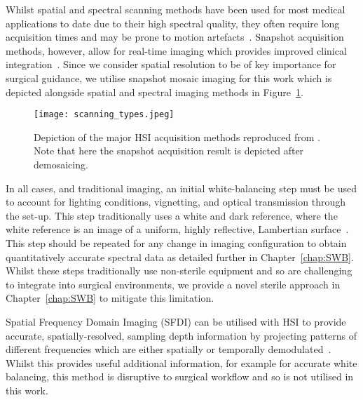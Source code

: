 Whilst spatial and spectral scanning methods have been used for most medical applications to date due to their high spectral quality, they often require long acquisition times and may be prone to motion artefacts~\citep{Kulcke2018, Giannoni2021, Shapey2019, Yoon2021}. Snapshot acquisition methods, however, allow for real-time imaging which provides improved clinical integration~\citep{Ayala2021, Ebner2021}. Since we consider spatial resolution to be of key importance for surgical guidance, we utilise snapshot mosaic imaging for this work which is depicted alongside spatial and spectral imaging methods in Figure~\ref{fig:scanning}.
\begin{figure}[h]
    \centering
    \texttt{[image: scanning\_types.jpeg]}
    \caption{Depiction of the major HSI acquisition methods reproduced from \citep{Araujo-Andrade2021}. Note that here the snapshot acquisition result is depicted after demosaicing.}
    \label{fig:scanning}
\end{figure}

In all cases, and traditional imaging, an initial white-balancing step must be used to account for lighting conditions, vignetting, and optical transmission through the set-up. This step traditionally uses a white and dark reference, where the white reference is an image of a uniform, highly reflective, Lambertian surface~\citep{Lu2014}. This step should be repeated for any change in imaging configuration to obtain quantitatively accurate spectral data as detailed further in Chapter~\ref{chap:SWB}. Whilst these steps traditionally use non-sterile equipment and so are challenging to integrate into surgical environments, we provide a novel sterile approach in Chapter~\ref{chap:SWB} to mitigate this limitation. 

Spatial Frequency Domain Imaging (SFDI) can be utilised with HSI to provide accurate, spatially-resolved, sampling depth information by projecting patterns of different frequencies which are either spatially or temporally demodulated~\citep{Gioux2019}. Whilst this provides useful additional information, for example for accurate white balancing, this method is disruptive to surgical workflow and so is not utilised in this work. 

